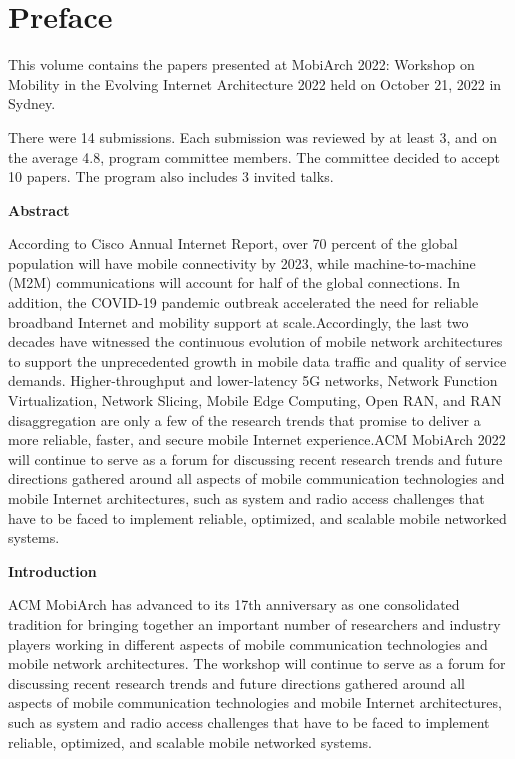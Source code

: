 \documentclass{easychair}
\begin{document}
\section*{Preface}
This volume contains the papers presented at MobiArch 2022: Workshop on Mobility in the Evolving Internet Architecture 2022 held on October 21, 2022 in Sydney.



There were 14 submissions. Each submission was reviewed by at least 3, and on the average 4.8, program committee members. The committee decided to accept 10 papers. The program also includes 3 invited talks.



\textbf{Abstract}



According to Cisco Annual Internet Report, over 70 percent of the global population will have mobile connectivity by 2023, while machine-to-machine (M2M) communications will account for half of the global connections. In addition, the COVID-19 pandemic outbreak accelerated the need for reliable broadband Internet and mobility support at scale.Accordingly, the last two decades have witnessed the continuous evolution of mobile network architectures to support the unprecedented growth in mobile data traffic and quality of service demands. Higher-throughput and lower-latency 5G networks, Network Function Virtualization, Network Slicing, Mobile Edge Computing, Open RAN, and RAN disaggregation are only a few of the research trends that promise to deliver a more reliable, faster, and secure mobile Internet experience.ACM MobiArch 2022 will continue to serve as a forum for discussing recent research trends and future directions gathered around all aspects of mobile communication technologies and mobile Internet architectures, such as system and radio access challenges that have to be faced to implement reliable, optimized, and scalable mobile networked systems.



\textbf{Introduction}



ACM MobiArch has advanced to its 17th anniversary as one consolidated tradition for bringing together an important number of researchers and industry players working in different aspects of mobile communication technologies and mobile network architectures. The workshop will continue to serve as a forum for discussing recent research trends and future directions gathered around all aspects of mobile communication technologies and mobile Internet architectures, such as system and radio access challenges that have to be faced to implement reliable, optimized, and scalable mobile networked systems.
\end{document}
